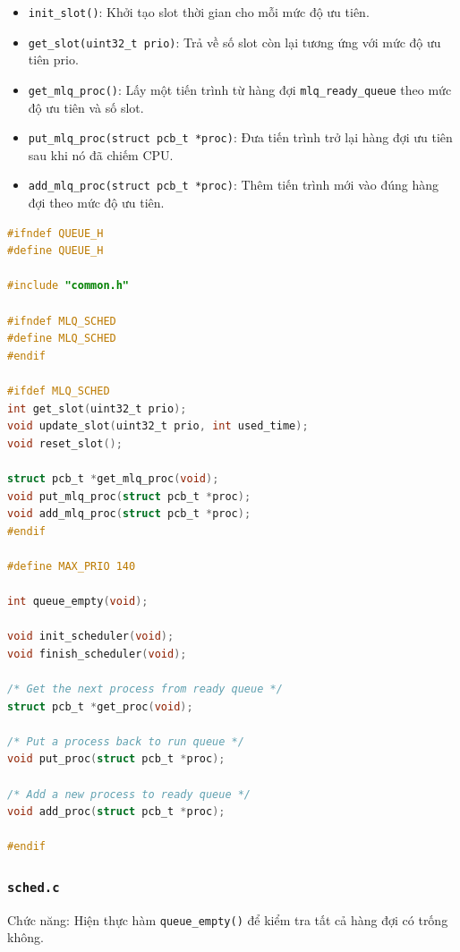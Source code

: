 \begin{itemize}
\begin{itemize}
        \item \texttt{init\_slot()}: Khởi tạo slot thời gian cho mỗi mức độ ưu tiên.
        \item \texttt{get\_slot(uint32\_t prio)}: Trả về số slot còn lại tương ứng với mức độ ưu tiên prio.
        \item \texttt{get\_mlq\_proc()}: Lấy một tiến trình từ hàng đợi \texttt{mlq\_ready\_queue} theo mức độ ưu tiên và số slot.
        \item \texttt{put\_mlq\_proc(struct pcb\_t *proc)}: Đưa tiến trình trở lại hàng đợi ưu tiên sau khi nó đã chiếm CPU.
        \item \texttt{add\_mlq\_proc(struct pcb\_t *proc)}: Thêm tiến trình mới vào đúng hàng đợi theo mức độ ưu tiên.
    \end{itemize}
\end{itemize}

\begin{lstlisting}[style=Cstyle,language=C]
#ifndef QUEUE_H
#define QUEUE_H

#include "common.h"

#ifndef MLQ_SCHED
#define MLQ_SCHED
#endif

#ifdef MLQ_SCHED
int get_slot(uint32_t prio);
void update_slot(uint32_t prio, int used_time);
void reset_slot();

struct pcb_t *get_mlq_proc(void);
void put_mlq_proc(struct pcb_t *proc);
void add_mlq_proc(struct pcb_t *proc);
#endif

#define MAX_PRIO 140

int queue_empty(void);

void init_scheduler(void);
void finish_scheduler(void);

/* Get the next process from ready queue */
struct pcb_t *get_proc(void);

/* Put a process back to run queue */
void put_proc(struct pcb_t *proc);

/* Add a new process to ready queue */
void add_proc(struct pcb_t *proc);

#endif
\end{lstlisting}


\subsubsection{\texttt{sched.c}}


Chức năng: Hiện thực hàm \texttt{queue\_empty()} để kiểm tra tất cả hàng đợi có trống không.

